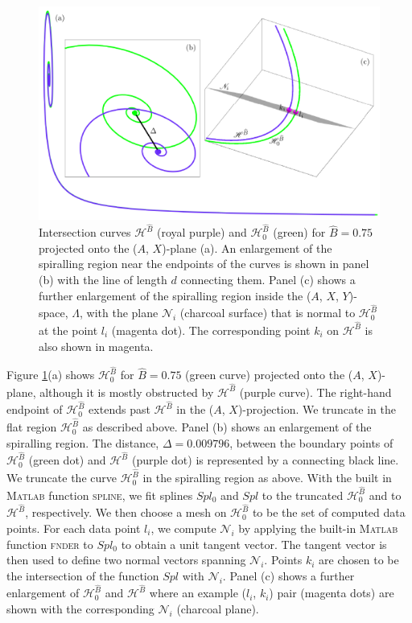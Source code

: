 \documentclass{ws-ijbc}
\begin{document}
\begin{figure}[H]
\centering
\includegraphics[]{./figures/MKMO_16.pdf}
\caption{Intersection curves $\mathscr{H}^{\widehat{B}}$ (royal purple) and $\mathscr{H}_0^{\widehat{B}}$ (green) for $\widehat{B}=0.75$ projected onto the ($A$, $X$)-plane (a).  An enlargement of the spiralling region near the endpoints of the curves is shown in panel (b) with the line of length $d$ connecting them.  Panel (c) shows a further enlargement of the spiralling region inside the ($A$, $X$, $Y$)-space, $\Lambda$, with the plane $\mathscr{N}_i$ (charcoal surface) that is normal to $\mathscr{H}_0^{\widehat{B}}$ at the point $l_i$ (magenta dot).  The corresponding point $k_i$ on $\mathscr{H}^{\widehat{B}}$ is also shown in magenta.}
\label{figure_16}
\end{figure}

Figure \ref{figure_16}(a) shows $\mathscr{H}_0^{\widehat{B}}$ for $\widehat{B}=0.75$ (green curve) projected onto the ($A$, $X$)-plane, although it is mostly obstructed by $\mathscr{H}^{\widehat{B}}$ (purple curve).  The right-hand endpoint of $\mathscr{H}_0^{\widehat{B}}$ extends past $\mathscr{H}^{\widehat{B}}$ in the ($A$, $X$)-projection.  We truncate in the flat region $\mathscr{H}_0^{\widehat{B}}$ as described above.  Panel (b) shows an enlargement of the spiralling region.  The distance, $\Delta=0.009796$, between the boundary points of $\mathscr{H}_0^{\widehat{B}}$ (green dot) and $\mathscr{H}^{\widehat{B}}$ (purple dot) is represented by a connecting black line.  We truncate the curve $\mathscr{H}_0^{\widehat{B}}$ in the spiralling region as above.  With the built in \textsc{Matlab} function \textsc{spline}, we fit splines $Spl_0$ and $Spl$ to the truncated $\mathscr{H}_0^{\widehat{B}}$ and to $\mathscr{H}^{\widehat{B}}$, respectively.  We then choose a mesh on $\mathscr{H}_0^{\widehat{B}}$ to be the set of computed data points.  For each data point $l_i$, we compute $\mathscr{N}_i$ by applying the built-in \textsc{Matlab} function \textsc{fnder} to $Spl_0$ to obtain a unit tangent vector.  The tangent vector is then used to define two normal vectors spanning $\mathscr{N}_i$.  Points $k_i$ are chosen to be the intersection of the function $Spl$ with $\mathscr{N}_i$. Panel (c) shows a further enlargement of $\mathscr{H}_0^{\widehat{B}}$ and $\mathscr{H}^{\widehat{B}}$ where an example ($l_i$, $k_i$) pair (magenta dots) are shown with the corresponding $\mathscr{N}_i$ (charcoal plane).
\end{document}
